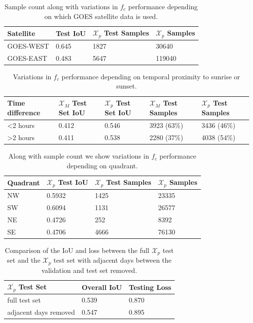 \documentclass{article}
\begin{document}
\begin{table}
    \caption{Sample count along with variations in \(f_c\) performance depending on which GOES satellite data is used.}
  \label{sample_count_sat}
  \centering
  \begin{tabular}{llll}
    \toprule
    Satellite & Test IoU & \(\mathcal{X}_p\) Test Samples & \(\mathcal{X}_p\) Samples \\
    \midrule
    GOES-WEST & 0.645 & 1827 & 30640   \\
    GOES-EAST & 0.483 & 5647 & 119040 \\
    \bottomrule
  \end{tabular}
\end{table}


\begin{table}
    \caption{Variations in \(f_c\) performance depending on temporal proximity to sunrise or sunset.}
  \label{two_hr_iou}
  \centering
  \begin{tabular}{lllll}
    \toprule
    Time difference & \(\mathcal{X}_M\) Test Set IoU & \(\mathcal{X}_p\) Test Set IoU & \(\mathcal{X}_M\) Test Samples & \(\mathcal{X}_p\) Test Samples \\ 
    \midrule
    <2 hours & 0.412 & 0.546 & 3923 (63\%) & 3436 (46\%)\\
    >2 hours & 0.411 & 0.538 & 2280 (37\%) &   4038 (54\%) \\
    \bottomrule
  \end{tabular}
\end{table}


\begin{table}
    \caption{Along with sample count we show variations in \(f_{c}\) performance depending on quadrant.}
  \label{quad}
  \centering
  \begin{tabular}{llll}
    \toprule
    Quadrant & \(\mathcal{X}_p\) Test IoU & \(\mathcal{X}_p\) Test Samples & \(\mathcal{X}_p\) Samples \\
    \midrule
    NW & 0.5932 & 1425  &  23335 \\
    SW & 0.6094 & 1131  &  26577 \\
    NE & 0.4726 & 252   &  8392 \\
    SE & 0.4706 & 4666  &  76130 \\
    \bottomrule
  \end{tabular}
\end{table}

\begin{table}
    \caption{Comparison of the IoU and loss between the full \(\mathcal{X}_p\) test set and the \(\mathcal{X}_p\) test set with adjacent days between the validation and test set removed.}
  \label{adjacent}
  \centering
  \begin{tabular}{lll}
    \toprule
    \(\mathcal{X}_p\) Test Set &   Overall IoU   &  Testing Loss \\
    \midrule
    full test set  & 0.539 &   0.870 \\
    adjacent days removed &  0.547 &  0.895 \\
    \bottomrule
  \end{tabular}
\end{table}
\end{document}
